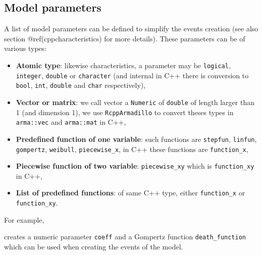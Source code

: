 \hypertarget{params}{%
\subsection{Model parameters}\label{params}}

A list of model parameters can be defined to simplify the events creation (see also section @ref(cppcharacteristics) for more details). These parameters can be of various types:

\begin{itemize}
\tightlist
\item
  \textbf{Atomic type}: likewise characteristics, a parameter may be \texttt{logical}, \texttt{integer}, \texttt{double} or \texttt{character} (and internal in C++ there is conversion to \texttt{bool}, \texttt{int}, \texttt{double} and \texttt{char} respectively),
\item
  \textbf{Vector or matrix}: we call vector a \texttt{Numeric} of \texttt{double} of length larger than 1 (and dimension 1), we use \texttt{RcppArmadillo} to convert theses types in \texttt{arma::vec} and \texttt{arma::mat} in C++,
\item
  \textbf{Predefined function of one variable}: such functions are \texttt{stepfun}, \texttt{linfun}, \texttt{gompertz}, \texttt{weibull}, \texttt{piecewise\_x}, in C++ these functions are \texttt{function\_x},
\item
  \textbf{Piecewise function of two variable}: \texttt{piecewise\_xy} which is \texttt{function\_xy} in C++,
\item
  \textbf{List of predefined functions}: of same C++ type, either \texttt{function\_x} or \texttt{function\_xy}.
\end{itemize}

For example,

\begin{Shaded}
\begin{Highlighting}[]
\StringTok{ }\NormalTok{(}\NormalTok{ =}\StringTok{ }\NormalTok{,}
               \NormalTok{ =}\StringTok{ }\NormalTok{(}\NormalTok{, }\NormalTok{))}
\end{Highlighting}
\end{Shaded}

creates a numeric parameter \texttt{coeff} and a Gompertz function \texttt{death\_function} which can be used when creating the events of the model.

